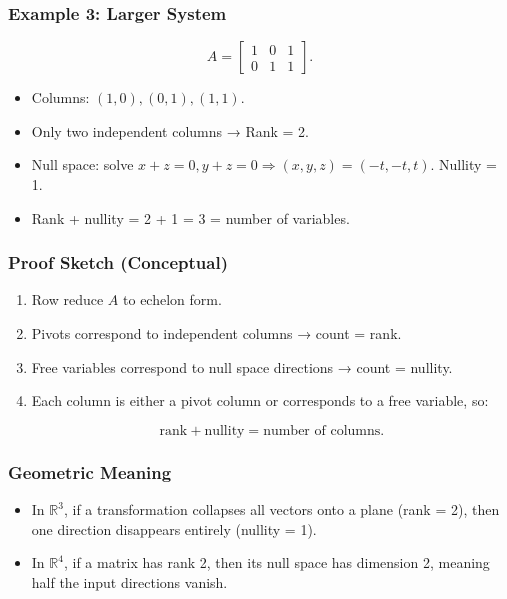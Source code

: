 \documentclass[
  letterpaper,
  DIV=11,
  numbers=noendperiod]{scrreprt}
\providecommand{\tightlist}{%
  \setlength{\itemsep}{0pt}\setlength{\parskip}{0pt}}
\begin{document}
\subsubsection{Example 3: Larger System}\label{example-3-larger-system}

\[
A = \begin{bmatrix}  
1 & 0 & 1 \\  
0 & 1 & 1  
\end{bmatrix}.
\]

\begin{itemize}
\tightlist
\item
  Columns: \((1,0), (0,1), (1,1)\).
\item
  Only two independent columns → Rank = 2.
\item
  Null space: solve
  \(x + z = 0, y + z = 0 \Rightarrow (x,y,z) = (-t,-t,t)\). Nullity = 1.
\item
  Rank + nullity = 2 + 1 = 3 = number of variables.
\end{itemize}

\subsubsection{Proof Sketch (Conceptual)}\label{proof-sketch-conceptual}

\begin{enumerate}
\def\labelenumi{\arabic{enumi}.}
\item
  Row reduce \(A\) to echelon form.
\item
  Pivots correspond to independent columns → count = rank.
\item
  Free variables correspond to null space directions → count = nullity.
\item
  Each column is either a pivot column or corresponds to a free
  variable, so:

  \[
  \text{rank} + \text{nullity} = \text{number of columns}.
  \]
\end{enumerate}

\subsubsection{Geometric Meaning}\label{geometric-meaning-5}

\begin{itemize}
\tightlist
\item
  In \(\mathbb{R}^3\), if a transformation collapses all vectors onto a
  plane (rank = 2), then one direction disappears entirely (nullity =
  1).
\item
  In \(\mathbb{R}^4\), if a matrix has rank 2, then its null space has
  dimension 2, meaning half the input directions vanish.
\end{itemize}
\end{document}
